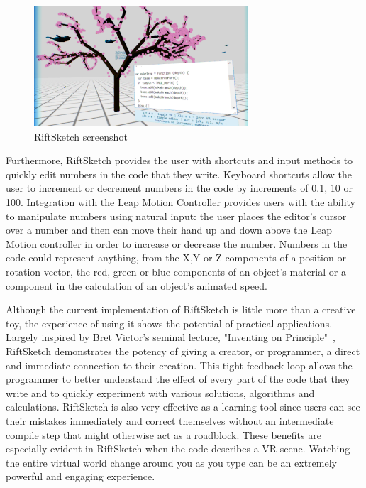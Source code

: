 \documentclass{acm_proc_article-sp}
\begin{document}
\begin{figure}[ht!]
\centering
\includegraphics[width=80mm]{figures/riftsketch/closer}
\caption{RiftSketch screenshot \label{riftsketch}}
\end{figure}

Furthermore, RiftSketch provides the user with shortcuts and input methods to quickly edit numbers in the code that they write. Keyboard shortcuts allow the user to increment or decrement numbers in the code by increments of 0.1, 10 or 100. Integration with the Leap Motion Controller provides users with the ability to manipulate numbers using natural input: the user places the editor's cursor over a number and then can move their hand up and down above the Leap Motion controller in order to increase or decrease the number. Numbers in the code could represent anything, from the X,Y or Z components of a position or rotation vector, the red, green or blue components of an object's material or a component in the calculation of an object's animated speed.

Although the current implementation of RiftSketch is little more than a creative toy, the experience of using it shows the potential of practical applications. Largely inspired by Bret Victor's seminal lecture, "Inventing on Principle"~\cite{Victor:InventingOnPrincipleVideo}\cite{Victor:InventingOnPrincipleTranscript}, RiftSketch demonstrates the potency of giving a creator, or programmer, a direct and immediate connection to their creation. This tight feedback loop allows the programmer to better understand the effect of every part of the code that they write and to quickly experiment with various solutions, algorithms and calculations. RiftSketch is also very effective as a learning tool since users can see their mistakes immediately and correct themselves without an intermediate compile step that might otherwise act as a roadblock.  These benefits are especially evident in RiftSketch when the code describes a VR scene. Watching the entire virtual world change around you as you type can be an extremely powerful and engaging experience.
\end{document}
